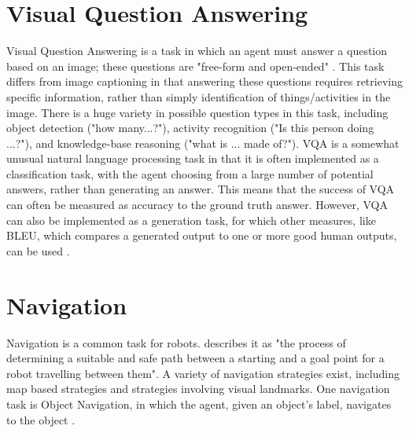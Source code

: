 \section{Visual Question Answering}
Visual Question Answering is a task in which an agent must answer a question based on an image; these questions are "free-form and open-ended" \cite{vqa_2015}. This task differs from image captioning in that answering these questions requires retrieving specific information, rather than simply identification %
of things/activities in the image. There is a huge variety in possible question types in this task, including object detection ("how many...?"), activity recognition ("Is this person doing ...?"), and knowledge-base reasoning ("what is ... made of?"). %
VQA is  a somewhat unusual natural language processing task in that it is often implemented as a classification task, with the agent choosing from a large number of potential answers, rather than generating an answer. %
This means that the success of VQA can often be measured as accuracy to the ground truth answer. However, VQA can also be implemented as a generation task, for which other measures, like BLEU, which compares a generated output to one or more good human outputs, can be used \cite{vqa_survey}\cite{bleu}. \newline
\section{Navigation}
Navigation is a common task for robots. \cite{visualnavigationsurvey} describes it as "the process of determining a suitable and safe path between a starting and a goal point for a robot travelling between them". A variety of navigation strategies exist, including map based strategies and strategies involving visual landmarks. \newline
One navigation task is Object Navigation, in which the agent, given an object's label, navigates to the object \cite{objectnavrevisited}. \newline
